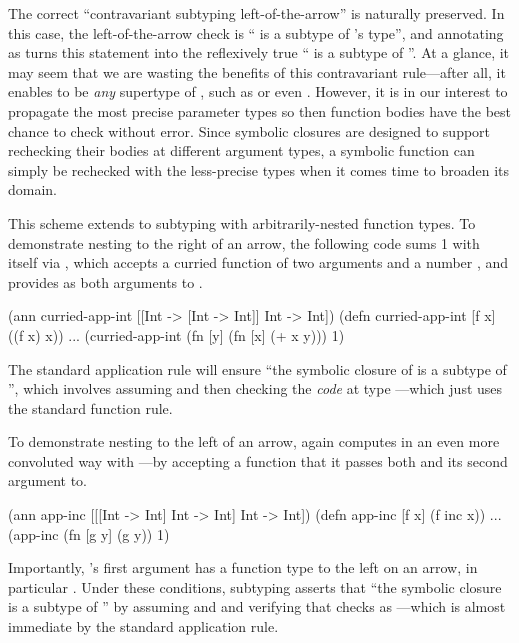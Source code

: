 The correct ``contravariant subtyping left-of-the-arrow''
is naturally preserved.
In this case, the left-of-the-arrow check is `` is a subtype of 's type'', and
annotating  as  turns this statement into the reflexively true `` is a subtype of ''.
At a glance, it may seem that we are wasting the benefits
of this contravariant rule---after all, it enables  to be \emph{any} supertype of
, such as  or even .
However, it is in our interest to propagate the most precise parameter types
so then function bodies have the best chance to check without error.
Since symbolic closures are designed to support rechecking their bodies at different argument types,
a symbolic function can simply be rechecked with the less-precise types
when it comes time to broaden its domain.

This scheme extends to subtyping with arbitrarily-nested function types.
To demonstrate nesting to the right of an arrow,
the following code sums 1 with itself via
, which accepts a curried
function of two arguments  and a number , and 
provides  as both arguments to .

\begin{cljlisting}
(ann curried-app-int [[Int -> [Int -> Int]] Int -> Int])
(defn curried-app-int [f x] ((f x) x))
...
(curried-app-int (fn [y] (fn [x] (+ x y))) 1)
\end{cljlisting}

The standard application rule will ensure 
``the symbolic closure of 
is a subtype of
'', which involves assuming
 and then checking the \emph{code} 
at type ---which just uses the standard
function rule.

To demonstrate nesting to the left of an arrow,
 again computes 
in an even more convoluted way with ---by accepting a function
 that it passes both  and its second argument to.

\begin{cljlisting}
(ann app-inc [[[Int -> Int] Int -> Int] Int -> Int])
(defn app-inc [f x] (f inc x))
...
(app-inc (fn [g y] (g y)) 1)
\end{cljlisting}

Importantly, 's first argument has a function
type to the left on an arrow, in particular .
Under these conditions, subtyping asserts that ``the symbolic
closure  is a subtype of ''
by assuming  and  and
verifying that  checks as ---which is almost immediate by
the standard application rule.

